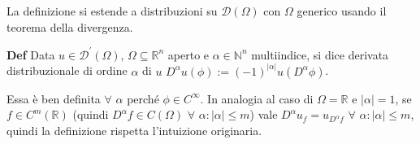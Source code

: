 \documentclass{article}
\begin{document}
La definizione si estende a distribuzioni su $\mathcal{D}\left( \Omega
\right) $ con $\Omega $ generico usando il teorema della divergenza.

\textbf{Def} Data $u\in \mathcal{D}^{\prime }\left( \Omega \right) $, $%
\Omega \subseteq 
\mathbb{R}
^{n}$ aperto e $\alpha \in 
\mathbb{N}
^{n}$ multiindice, si dice derivata distribuzionale di ordine $\alpha $ di $%
u $ $D^{\alpha }u\left( \phi \right) :=\left( -1\right) ^{\left\vert \alpha
\right\vert }u\left( D^{\alpha }\phi \right) $.

Essa \`{e} ben definita $\forall $ $\alpha $ perch\'{e} $\phi \in C^{\infty
} $. In analogia al caso di $\Omega =%
\mathbb{R}
$ e $\left\vert \alpha \right\vert =1$, se $f\in C^{m}\left( 
\mathbb{R}
\right) $ (quindi $D^{\alpha }f\in C\left( \Omega \right) $ $\forall $ $%
\alpha :\left\vert \alpha \right\vert \leq m$) vale $D^{\alpha
}u_{f}=u_{D^{\alpha }f}$ $\forall $ $\alpha :\left\vert \alpha \right\vert
\leq m$, quindi la definizione rispetta l'intuizione originaria.
\end{document}
